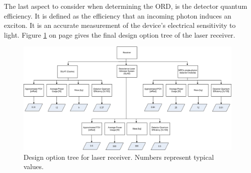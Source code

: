 The last aspect to consider when determining the \acs{ORD}, is the detector quantum efficiency. It is defined as the efficiency that an incoming photon induces an exciton. It is an accurate measurement of the device's electrical sensitivity to light. 
Figure \ref{DOS_receiver} on page \pageref{DOS_receiver} gives the final design option tree of the laser receiver.
\begin{figure} [ht]
	\begin{center} \includegraphics[width=1\textwidth,angle=90]{chapters/img/DOStree_receiver.jpg}	
	\caption{Design option tree for laser receiver. Numbers represent typical values.}
	\label{DOS_receiver}
	\end{center}
\end{figure}